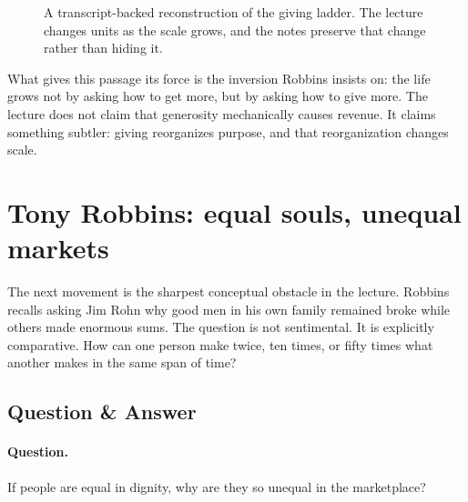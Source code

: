 \begin{figure}[h]
\centering
{}
\caption{A transcript-backed reconstruction of the giving ladder. The lecture changes units as the scale grows, and the notes preserve that change rather than hiding it.}
\end{figure}

What gives this passage its force is the inversion Robbins insists on: the life grows not by asking how to get more, but by asking how to give more. The lecture does not claim that generosity mechanically causes revenue. It claims something subtler: giving reorganizes purpose, and that reorganization changes scale.

\section{Tony Robbins: equal souls, unequal markets}

The next movement is the sharpest conceptual obstacle in the lecture. Robbins recalls asking Jim Rohn why good men in his own family remained broke while others made enormous sums. The question is not sentimental. It is explicitly comparative. How can one person make twice, ten times, or fifty times what another makes in the same span of time?

\subsection{Question \& Answer}

\paragraph{Question.} If people are equal in dignity, why are they so unequal in the marketplace?

